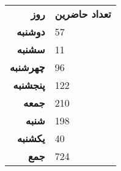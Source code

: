 \documentclass{article}
\begin{document}
\begin{tabular}
    {>{\columncolor{blue}\color{white}\bfseries}rl}
\rowcolor[gray]{0.8}
    \color{black} روز & \bfseries تعداد حاضرین\\[2pt]
دوشنبه&    57 \\  سشنبه&   11 \\
چهرشنبه& 96 \\  پنجشنبه& 122 \\
جمعه&   210 \\  شنبه& 198 \\
یکشنبه&    40 \\
\cellcolor[gray]{0.8}\color{black}جمع& 724
\end{tabular}
\end{document}
